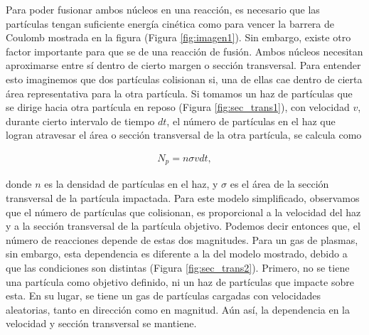 \documentclass[../main.tex]{subfiles}
\begin{document}
	Para poder fusionar ambos núcleos en una reacción, es necesario que las partículas tengan suficiente energía cinética como para vencer la barrera de Coulomb mostrada en la figura (Figura \ref{fig:imagen1}). Sin embargo, existe otro factor importante para que se de una reacción de fusión. Ambos núcleos necesitan aproximarse entre sí dentro de cierto margen o sección transversal. Para entender esto imaginemos que dos partículas colisionan si, una de ellas cae dentro de cierta área representativa para la otra partícula. Si tomamos un haz de partículas que se dirige hacia otra partícula en reposo (Figura \ref{fig:sec_trans1}), con velocidad $v$, durante cierto intervalo de tiempo $dt$, el número de partículas en el haz que logran atravesar el área o sección transversal de la otra partícula, se calcula como
	
	\begin{align} \label{equ3}
	    N_p = n\sigma v dt,
	    \label{numero_part_cilindro}
	\end{align}
	
	donde $n$ es la densidad de partículas en el haz, y $\sigma$ es el área de la sección transversal de la partícula impactada. Para este modelo simplificado, observamos que el número de partículas que colisionan, es proporcional a la velocidad del haz y a la sección transversal de la partícula objetivo. Podemos decir entonces que, el número de reacciones depende de estas dos magnitudes. Para un gas de plasmas, sin embargo, esta dependencia es diferente a la del modelo mostrado, debido a que las condiciones son distintas (Figura \ref{fig:sec_trans2}). Primero, no se tiene una partícula como objetivo definido, ni un haz de partículas que impacte sobre esta. En su lugar, se tiene un gas de partículas cargadas con velocidades aleatorias, tanto en dirección como en magnitud. Aún así, la dependencia en la velocidad y sección transversal se mantiene.\\
	
\end{document}
